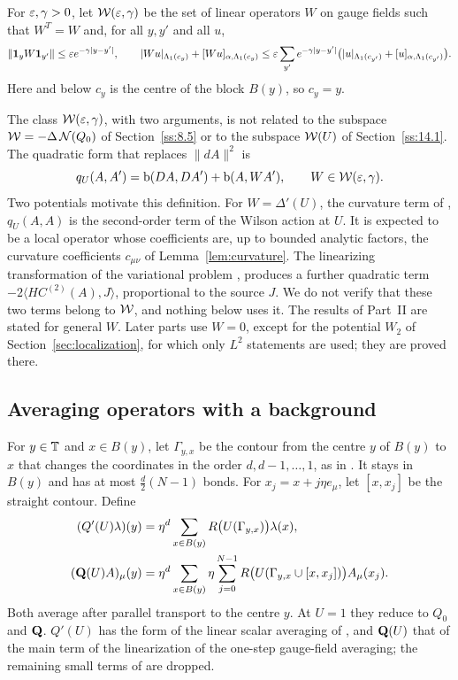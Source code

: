 \begin{definition}\label{x:12.4}
For $\varepsilon,\gamma>0$, let $\mathcal W(\varepsilon,\gamma)$ be the set of linear operators $W$ on gauge fields such that $W^T=W$ and, for all $y,y'$ and all $u$,
\[
\|\mathbf 1_yW\mathbf 1_{y'}\|\le\varepsilon e^{-\gamma|y-y'|},\qquad
|Wu|_{\Lambda_1(c_y)}+[Wu]_{\alpha,\Lambda_1(c_y)}\le\varepsilon\sum_{y'}e^{-\gamma|y-y'|}\big(|u|_{\Lambda_1(c_{y'})}+[u]_{\alpha,\Lambda_1(c_{y'})}\big).
\]
Here and below $c_y$ is the centre of the block $B(y)$, so $c_y=y$.
\end{definition}

The class $\mathcal W(\varepsilon,\gamma)$, with two arguments, is not related to the subspace $\mathcal W=-\Delta\,\mathcal N(Q_0)$ of Section~\ref{ss:8.5} or to the subspace $\mathcal W(U)$ of Section~\ref{ss:14.1}. The quadratic form that replaces $\|dA\|^2$ is
\[
q_U(A,A')=\mathrm b(DA,DA')+\mathrm b(A,WA'),\qquad W\in\mathcal W(\varepsilon,\gamma).
\]
Two potentials motivate this definition. For $W=\Delta'(U)$, the curvature term of \cite[(3.10)]{BalBackground}, $q_U(A,A)$ is the second-order term of the Wilson action at $U$. It is expected to be a local operator whose coefficients are, up to bounded analytic factors, the curvature coefficients $c_{\mu\nu}$ of Lemma~\ref{lem:curvature}. The linearizing transformation of the variational problem \cite[(79)]{BalVar}, \cite[(3.127)--(3.128)]{BalBackground} produces a further quadratic term $-2\langle HC^{(2)}(A),J\rangle$, proportional to the source $J$. We do not verify that these two terms belong to $\mathcal W$, and nothing below uses it. The results of Part~II are stated for general $W$. Later parts use $W=0$, except for the potential $W_2$ of Section~\ref{sec:localization}, for which only $L^2$ statements are used; they are proved there.

\subsection{Averaging operators with a background}\label{ss:12.5}

For $y\in\mathbb T$ and $x\in B(y)$, let $\Gamma_{y,x}$ be the contour from the centre $y$ of $B(y)$ to $x$ that changes the coordinates in the order $d,d-1,\dots,1$, as in \cite[(1.7)]{BalPropI}. It stays in $B(y)$ and has at most $\frac d2(N-1)$ bonds. For $x_j=x+j\eta e_\mu$, let $[x,x_j]$ be the straight contour. Define
\begin{align*}
(Q'(U)\lambda)(y)&=\eta^d\sum_{x\in B(y)}R\big(U(\Gamma_{y,x})\big)\lambda(x),\\
(\mathbf Q(U)A)_\mu(y)&=\eta^d\sum_{x\in B(y)}\eta\sum_{j=0}^{N-1}R\big(U(\Gamma_{y,x}\cup[x,x_j])\big)A_\mu(x_j).
\end{align*}
Both average after parallel transport to the centre $y$. At $U=1$ they reduce to $Q_0$ and $\mathbf Q$. $Q'(U)$ has the form of the linear scalar averaging of \cite[(3.18), (3.19)]{BalBackground}, and $\mathbf Q(U)$ that of the main term \cite[(125)]{BalAvg} of the linearization \cite[(124)]{BalAvg} of the one-step gauge-field averaging; the remaining small terms of \cite[(124)]{BalAvg} are dropped.

